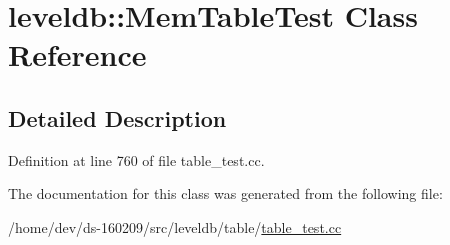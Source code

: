 \hypertarget{classleveldb_1_1_mem_table_test}{}\section{leveldb\+:\+:Mem\+Table\+Test Class Reference}
\label{classleveldb_1_1_mem_table_test}


\subsection{Detailed Description}


Definition at line 760 of file table\+\_\+test.\+cc.



The documentation for this class was generated from the following file\+:\begin{DoxyCompactItemize}
\item 
/home/dev/ds-\/160209/src/leveldb/table/\hyperlink{table__test_8cc}{table\+\_\+test.\+cc}\end{DoxyCompactItemize}
